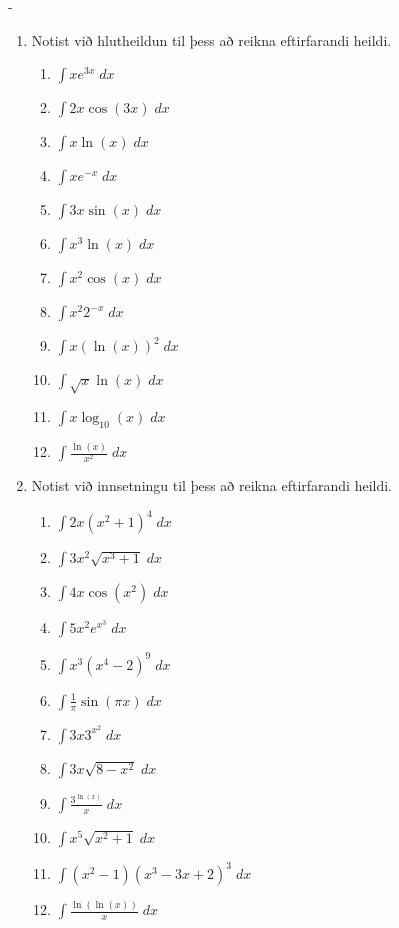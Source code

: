 \begin{adjustwidth}{-\hangingaefingar}{}
\begin{enumerate}
\item Notist við hlutheildun til þess að reikna eftirfarandi heildi.
\begin{multicols}{2}
\begin{enumerate}
\setlength\itemsep{4mm}
\item $\displaystyle \int xe^{3x} \; dx$
\item $\displaystyle \int 2x\cos(3x) \; dx$
\item $\displaystyle \int x\ln(x) \; dx$
\item $\displaystyle \int xe^{-x} \; dx$
\item $\displaystyle \int 3x\sin(x) \; dx$
\item $\displaystyle \int x^{3}\ln(x) \; dx$
\item $\displaystyle \int x^{2}\cos(x)\; dx$
\item $\displaystyle \int x^{2}2^{-x}\; dx$
\item $\displaystyle \int x\left(\ln(x)\right)^{2} \; dx$
\item $\displaystyle \int \sqrt{x}\ln(x) \; dx$
\item $\displaystyle \int x\log_{10}(x) \; dx$
\item $\displaystyle \int \frac{\ln(x)}{x^{2}}\; dx$
\end{enumerate}
\end{multicols}

\item Notist við innsetningu til þess að reikna eftirfarandi heildi.
\begin{multicols}{2}
\begin{enumerate}
\setlength\itemsep{4mm}
\item $\displaystyle \int 2x\left(x^{2}+1\right)^{4} \; dx$
\item $\displaystyle \int 3x^{2}\sqrt{x^{3}+1} \; dx$
\item $\displaystyle \int 4x\cos\left(x^{2}\right) \; dx$
\item $\displaystyle \int 5x^{2}e^{x^{3}} \; dx$
\item $\displaystyle \int x^{3}\left(x^{4}-2\right)^{9}\; dx$
\item $\displaystyle \int \frac{1}{\pi}\sin\left(\pi x\right)\; dx$
\item $\displaystyle \int 3x3^{x^{2}} \; dx$
\item $\displaystyle \int 3x\sqrt{8-x^{2}} \; dx$
\item $\displaystyle \int \frac{3^{\ln(x)}}{x} \; dx$
\item $\displaystyle \int x^{5}\sqrt{x^{2}+1} \; dx$
\item $\displaystyle \int (x^2-1)(x^3-3x+2)^{3} \; dx$
\item $\displaystyle \int \frac{\ln(\ln(x))}{x} \; dx$
\end{enumerate}
\end{multicols}


\end{enumerate}
\end{adjustwidth}

